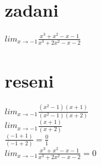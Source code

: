 \documentclass[a4paper]{article}
\def\doubleunderline#1{\underline{\underline{#1}}}
\begin{document}
\section*{zadani}
$lim_{x \rightarrow -1} \frac{x^3+x^2-x-1}{x^3+2x^2-x-2}$

\section*{reseni}
$lim_{x \rightarrow -1} \frac{(x^2-1)(x+1)}{(x^2-1)(x+2)}$\\
$lim_{x \rightarrow -1} \frac{(x+1)}{(x+2)}$\\
$\frac{(-1+1)}{(-1+2)} = \frac{0}{1}$\\
\doubleunderline{$lim_{x \rightarrow -1} \frac{x^3+x^2-x-1}{x^3+2x^2-x-2} = 0$}
\end{document}
